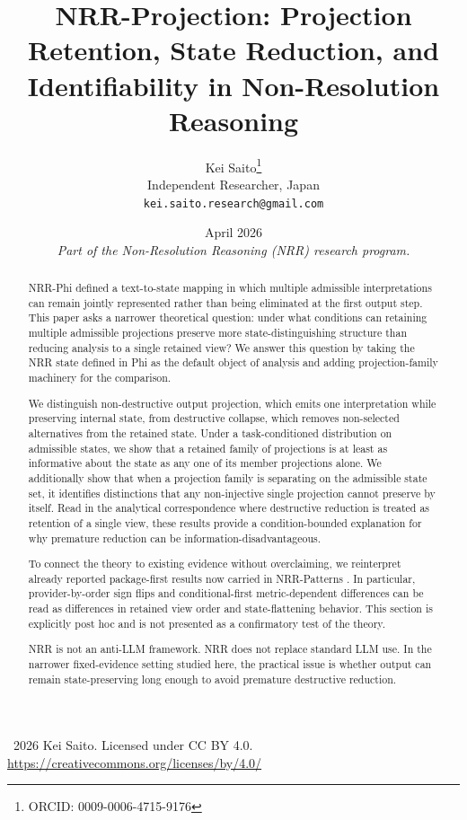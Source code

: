 \documentclass[11pt,a4paper]{article}
\title{\textbf{NRR-Projection: Projection Retention, State Reduction, and Identifiability in Non-Resolution Reasoning}}
\author{
  Kei Saito\thanks{ORCID: 0009-0006-4715-9176} \\
  Independent Researcher, Japan \\
  \texttt{kei.saito.research@gmail.com}
}
\date{April 2026 \\[0.5em]
\textit{Part of the Non-Resolution Reasoning (NRR) research program.}}
\begin{document}
\maketitle

\begin{center}
\textcopyright\ 2026 Kei Saito.
Licensed under CC BY 4.0.\\
\url{https://creativecommons.org/licenses/by/4.0/}
\end{center}

\begin{abstract}
NRR-Phi \cite{saito2026phi} defined a text-to-state mapping in which multiple admissible interpretations can remain jointly represented rather than being eliminated at the first output step. This paper asks a narrower theoretical question: under what conditions can retaining multiple admissible projections preserve more state-distinguishing structure than reducing analysis to a single retained view? We answer this question by taking the NRR state defined in Phi as the default object of analysis and adding projection-family machinery for the comparison.

We distinguish non-destructive output projection, which emits one interpretation while preserving internal state, from destructive collapse, which removes non-selected alternatives from the retained state. Under a task-conditioned distribution on admissible states, we show that a retained family of projections is at least as informative about the state as any one of its member projections alone. We additionally show that when a projection family is separating on the admissible state set, it identifies distinctions that any non-injective single projection cannot preserve by itself. Read in the analytical correspondence where destructive reduction is treated as retention of a single view, these results provide a condition-bounded explanation for why premature reduction can be information-disadvantageous.

To connect the theory to existing evidence without overclaiming, we reinterpret already reported package-first results now carried in NRR-Patterns \cite{saito2026patterns}. In particular, provider-by-order sign flips and conditional-first metric-dependent differences can be read as differences in retained view order and state-flattening behavior. This section is explicitly post hoc and is not presented as a confirmatory test of the theory.

NRR is not an anti-LLM framework. NRR does not replace standard LLM use. In the narrower fixed-evidence setting studied here, the practical issue is whether output can remain state-preserving long enough to avoid premature destructive reduction.
\end{abstract}
\end{document}
